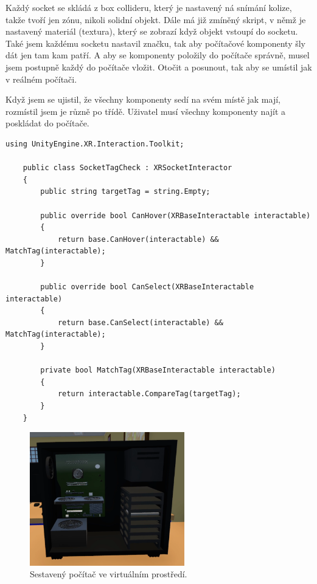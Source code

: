 \documentclass[12pt, a4paper,
twoside,        %
openright
]{report}
\begin{document}
Každý socket se skládá z box collideru, který je nastavený ná snímání kolize, takže tvoří jen zónu, nikoli solidní objekt. Dále má již zmíněný skript, v němž je nastavený materiál (textura), který se zobrazí když objekt vstoupí do socketu. Také jsem každému socketu nastavil značku, tak aby počítačové komponenty šly dát jen tam kam patří. A aby se komponenty položily do počítače správně, musel jsem postupně každý do počítače vložit. Otočit a posunout, tak aby se umístil jak v reálném počítači.

Když jsem se ujistil, že všechny komponenty sedí na svém místě jak mají, rozmístil jsem je různě po třídě. Uživatel musí všechny komponenty najít a poskládat do počítače.

\begin{lstlisting}[style=csh, caption={Skrip, který přidá kontrolu značky objektu.}]	
	using UnityEngine.XR.Interaction.Toolkit;
	
	public class SocketTagCheck : XRSocketInteractor
	{
		public string targetTag = string.Empty;
		
		public override bool CanHover(XRBaseInteractable interactable)
		{
			return base.CanHover(interactable) && MatchTag(interactable);
		}
		
		public override bool CanSelect(XRBaseInteractable interactable)
		{
			return base.CanSelect(interactable) && MatchTag(interactable);
		}
		
		private bool MatchTag(XRBaseInteractable interactable)
		{
			return interactable.CompareTag(targetTag);
		}
	}
\end{lstlisting}

\newpage

\begin{figure}[H]
	\centering 
	\includegraphics[width=0.6\textwidth]{image/pc.png} 
	\caption{Sestavený počítač ve virtuálním prostředí.} 
	\label{fig:pc} 
\end{figure}
\end{document}
